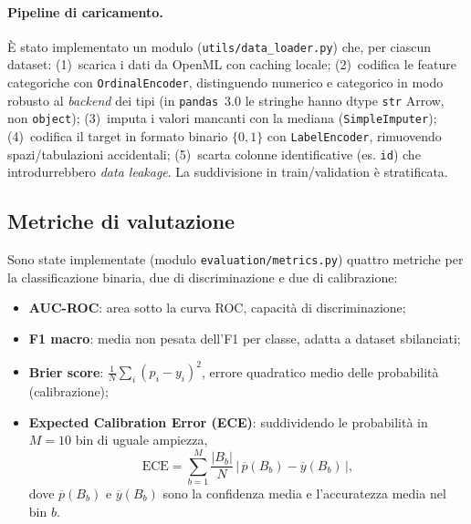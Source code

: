 \documentclass[11pt,a4paper]{article}
\begin{document}
\paragraph{Pipeline di caricamento.} È stato implementato un modulo
(\texttt{utils/data\_loader.py}) che, per ciascun dataset: (1)~scarica i dati da
OpenML con caching locale; (2)~codifica le feature categoriche con
\texttt{OrdinalEncoder}, distinguendo numerico e categorico in modo robusto al
\emph{backend} dei tipi (in \texttt{pandas}~3.0 le stringhe hanno dtype
\texttt{str} Arrow, non \texttt{object}); (3)~imputa i valori mancanti con la
mediana (\texttt{SimpleImputer}); (4)~codifica il target in formato binario
$\{0,1\}$ con \texttt{LabelEncoder}, rimuovendo spazi/tabulazioni accidentali;
(5)~scarta colonne identificative (es. \texttt{id}) che introdurrebbero
\emph{data leakage}. La suddivisione in train/validation è stratificata.

\subsection{Metriche di valutazione}
Sono state implementate (modulo \texttt{evaluation/metrics.py}) quattro metriche
per la classificazione binaria, due di discriminazione e due di calibrazione:
\begin{itemize}[nosep]
  \item \textbf{AUC-ROC}: area sotto la curva ROC, capacità di discriminazione;
  \item \textbf{F1 macro}: media non pesata dell'F1 per classe, adatta a dataset
  sbilanciati;
  \item \textbf{Brier score}: $\frac{1}{N}\sum_i (p_i - y_i)^2$, errore quadratico
  medio delle probabilità (calibrazione);
  \item \textbf{Expected Calibration Error (ECE)}: suddividendo le probabilità in
  $M=10$ bin di uguale ampiezza,
  \begin{equation}
    \mathrm{ECE} = \sum_{b=1}^{M} \frac{|B_b|}{N}\,
    \bigl|\,\overline{p}(B_b) - \overline{y}(B_b)\,\bigr|,
  \end{equation}
  dove $\overline{p}(B_b)$ e $\overline{y}(B_b)$ sono la confidenza media e
  l'accuratezza media nel bin $b$.
\end{itemize}
\end{document}
